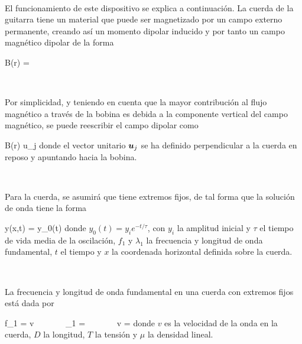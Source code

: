 \

El funcionamiento de este dispositivo se explica a continuación. La cuerda
de la guitarra tiene un material que puede ser magnetizado por un campo 
externo permanente, creando así un momento dipolar inducido y por tanto
un campo magnético dipolar de la forma

{\bds B(\bds r) = }

\

Por simplicidad, y teniendo en cuenta que la mayor contribución al flujo 
magnético a través de la bobina es debida a la componente vertical del 
campo magnético, se puede reescribir el campo dipolar como

{\bds B(\bds r) \approx {}\bds u_j}
donde el vector unitario $\boldsymbol{ u }_j$ se ha definido perpendicular a la 
cuerda en reposo y apuntando hacia la bobina.

\

Para la cuerda, se asumirá que tiene extremos fijos, de tal forma que la 
solución de onda tiene la forma 

{y(x,t) = y_0(t)\sin{}}
donde $y_0(t) = y_i e^{-t/\tau}$, con $y_i$ la amplitud inicial y $\tau$
el tiempo de vida media de la oscilación, $f_1$ y $\lambda_1$ la frecuencia
y longitud de onda fundamental, $t$ el tiempo y $x$ la coordenada horizontal
definida sobre la cuerda.

\

La frecuencia y longitud de onda fundamental en una cuerda con extremos 
fijos está dada por

{f_1 = v \ \ \ \ \ \ \ \lambda_1 = \ \ \ \ \ \ \ 
v = }
donde $v$ es la velocidad de la onda en la cuerda, $D$ la longitud, $T$ la
tensión y $\mu$ la densidad lineal.

